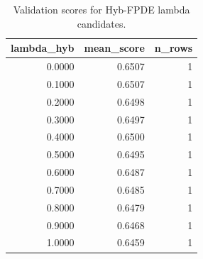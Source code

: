 \begin{table}[t]
\caption{Validation scores for Hyb-FPDE lambda candidates.}
\label{tab:lambda_distribution_computed}
\centering
\begin{tabular}{rrr}
\toprule
lambda\_hyb & mean\_score & n\_rows \\
\midrule
0.0000 & 0.6507 & 1 \\
0.1000 & 0.6507 & 1 \\
0.2000 & 0.6498 & 1 \\
0.3000 & 0.6497 & 1 \\
0.4000 & 0.6500 & 1 \\
0.5000 & 0.6495 & 1 \\
0.6000 & 0.6487 & 1 \\
0.7000 & 0.6485 & 1 \\
0.8000 & 0.6479 & 1 \\
0.9000 & 0.6468 & 1 \\
1.0000 & 0.6459 & 1 \\
\bottomrule
\end{tabular}

\end{table}
